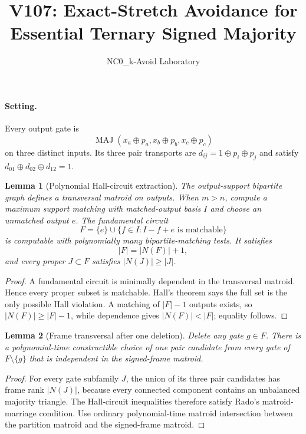 \documentclass[11pt]{article}
\newtheorem{lemma}{Lemma}
\begin{document}
\title{V107: Exact-Stretch Avoidance for Essential Ternary Signed Majority}
\author{NC0\_k-Avoid Laboratory}
\date{}
\maketitle

\paragraph{Setting.}
Every output gate is
\[
 \operatorname{MAJ}(x_a\oplus p_a,x_b\oplus p_b,x_c\oplus p_c)
\]
on three distinct inputs. Its three pair transports are
$d_{ij}=1\oplus p_i\oplus p_j$ and satisfy
$d_{01}\oplus d_{02}\oplus d_{12}=1$.

\begin{lemma}[Polynomial Hall-circuit extraction]
The output-support bipartite graph defines a transversal matroid on outputs.
When $m>n$, compute a maximum support matching with matched-output basis $I$ and
choose an unmatched output $e$. The fundamental circuit
\[
 F=\{e\}\cup\{f\in I: I-f+e\text{ is matchable}\}
\]
is computable with polynomially many bipartite-matching tests. It satisfies
\[
 |F|=|N(F)|+1,
\]
and every proper $J\subset F$ satisfies $|N(J)|\ge |J|$.
\end{lemma}

\begin{proof}
A fundamental circuit is minimally dependent in the transversal matroid. Hence
every proper subset is matchable. Hall's theorem says the full set is the only
possible Hall violation. A matching of $|F|-1$ outputs exists, so
$|N(F)|\ge |F|-1$, while dependence gives $|N(F)|<|F|$; equality follows.
\end{proof}

\begin{lemma}[Frame transversal after one deletion]
Delete any gate $g\in F$. There is a polynomial-time constructible choice of
one pair candidate from every gate of $F\setminus\{g\}$ that is independent in
the signed-frame matroid.
\end{lemma}

\begin{proof}
For every gate subfamily $J$, the union of its three pair candidates has frame
rank $|N(J)|$, because every connected component contains an unbalanced majority
triangle. The Hall-circuit inequalities therefore satisfy Rado's
matroid-marriage condition. Use ordinary polynomial-time matroid intersection
between the partition matroid and the signed-frame matroid.
\end{proof}
\end{document}
